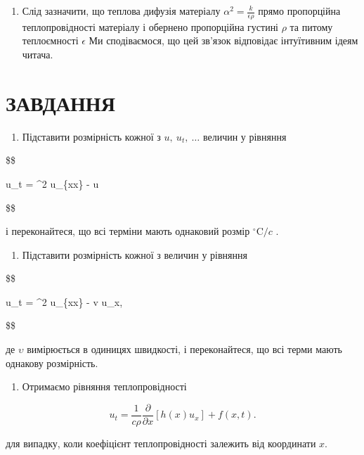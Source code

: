 \begin{enumerate}
\def\labelenumi{\arabic{enumi}.}
\setcounter{enumi}{3}
\tightlist
\item
  Слід зазначити, що теплова дифузія матеріалу \(\alpha^2 = \frac{k}{\epsilon \rho}\) прямо пропорційна теплопровідності матеріалу і обернено пропорційна густині \(\rho\) та питому теплоємності \(\epsilon\) Ми сподіваємося, що цей зв'язок відповідає інтуїтивним ідеям читача.
\end{enumerate}

\section{ЗАВДАННЯ}\label{ux437ux430ux432ux434ux430ux43dux43dux44f-3}

\begin{enumerate}
\def\labelenumi{\arabic{enumi}.}
\tightlist
\item
  Підставити розмірність кожної з \(u,\ u_t,\ \dots\) величин у рівняння
\end{enumerate}

\$\$

u\_t = \alpha\^{}2 u\_\{xx\} - \beta u

\$\$

і переконайтеся, що всі терміни мають однаковий розмір \({}^{\circ}\mathrm{C}/c\) .

\begin{enumerate}
\def\labelenumi{\arabic{enumi}.}
\setcounter{enumi}{1}
\tightlist
\item
  Підставити розмірність кожної з величин у рівняння
\end{enumerate}

\$\$

u\_t = \alpha\^{}2 u\_\{xx\} - v u\_x,

\$\$

де \(\upsilon\) вимірюється в одиницях швидкості, і переконайтеся, що всі терми мають однакову розмірність.

\begin{enumerate}
\def\labelenumi{\arabic{enumi}.}
\setcounter{enumi}{2}
\tightlist
\item
  Отримаємо рівняння теплопровідності
\end{enumerate}

\[
u_t = \frac{1}{c\rho}\frac{\partial}{\partial x}\left[h(x)u_x\right] + f(x,t).
\]

для випадку, коли коефіцієнт теплопровідності залежить від координати \(x\).

